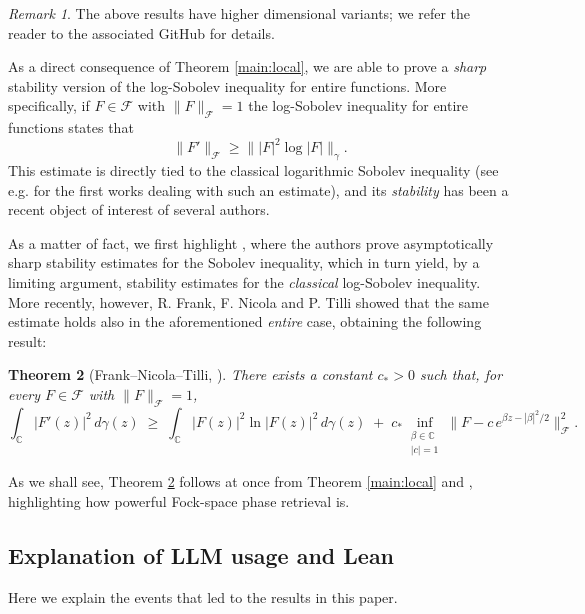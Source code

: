 \documentclass[11pt]{amsart}
\newtheorem{theorem}{Theorem}[section]
\theoremstyle{remark}
\newtheorem{remark}[theorem]{Remark}
\begin{document}
\begin{remark}
    The above results have higher dimensional variants; we refer the reader to the associated GitHub for details.
\end{remark}

As a direct consequence of Theorem \ref{main:local}, we are able to prove a \emph{sharp} stability version of the log-Sobolev inequality for entire functions. More specifically, if $F \in \mathcal{F}$ with $\|F\|_{\mathcal{F}}= 1$ the log-Sobolev inequality for entire functions states that 
\[
\|F'\|_{\mathcal{F}} \geq \||F|^2 \log |F|\|_{\gamma}.
\]
This estimate is directly tied to the classical logarithmic Sobolev inequality (see e.g. \cite{Gross1975,Stam1959,Weissler1978} for the first works dealing with such an estimate), and its \emph{stability} has been a recent object of interest of several authors. 

As a matter of fact, we first highlight \cite{DolbeaultEstebanFigalliFrankLoss2025}, where the authors prove asymptotically sharp stability estimates for the Sobolev inequality, which in turn yield, by a limiting argument, stability estimates for the \emph{classical} log-Sobolev inequality. More recently, however, R. Frank, F. Nicola and P. Tilli \cite{FrankNicolaTilli2025} showed that the same estimate holds also in the aforementioned \emph{entire} case, obtaining the following result: 

\begin{theorem}[Frank--Nicola--Tilli, {\cite[Thm.~14]{FrankNicolaTilli2025}}]\label{thm:FNTLogSob}
There exists a constant $c_\ast > 0$ such that, for every
$F \in \mathcal{F}$ with $\|F\|_{\mathcal{F}} = 1$,
\begin{equation}
  \int_{\mathbb{C}} |F'(z)|^2 \, d\gamma(z)
  \;\ge\;
  \int_{\mathbb{C}} |F(z)|^2 \ln |F(z)|^2 \, d\gamma(z)
  \;+\;
  c_\ast \!\!\inf_{\substack{\beta \in \mathbb{C} \\ |c|=1}}\!
  \bigl\| F - c\, e^{\beta z - |\beta|^2/2} \bigr\|_{\mathcal{F}}^{2}.
\end{equation}
\end{theorem}

As we shall see, Theorem \ref{thm:FNTLogSob} follows at once from Theorem \ref{main:local} and \cite[Corollary~1.2]{DolbeaultEstebanFigalliFrankLoss2025}, highlighting how powerful Fock-space phase retrieval is. 

\subsection{Explanation of LLM usage and Lean}\label{LLM Sect}
Here we explain the events that led to the results in this paper.
\medskip
\end{document}
